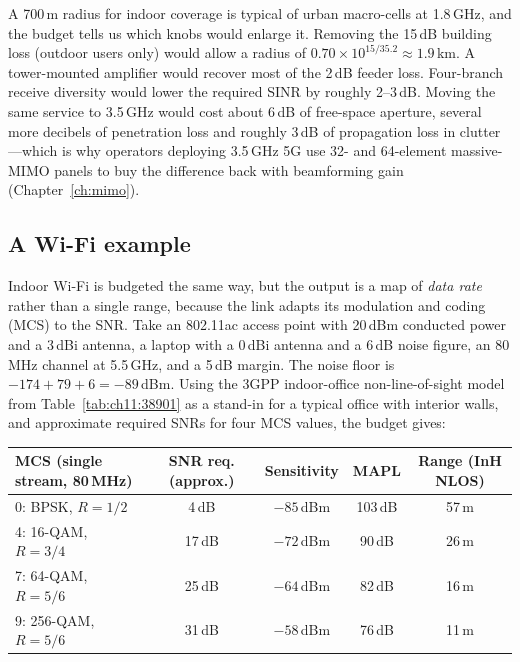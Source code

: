 
A 700\,m radius for indoor coverage is typical of urban macro-cells at 1.8\,GHz, and the budget
tells us which knobs would enlarge it. Removing the 15\,dB building loss (outdoor users only)
would allow a radius of $0.70\times10^{15/35.2}\approx1.9$\,km. A tower-mounted amplifier would
recover most of the 2\,dB feeder loss. Four-branch receive diversity would lower the required
SINR by roughly 2--3\,dB. Moving the same service to 3.5\,GHz would cost about 6\,dB of free-space
aperture, several more decibels of penetration loss and roughly 3\,dB of propagation loss in
clutter---which is why operators deploying 3.5\,GHz 5G use 32- and 64-element massive-MIMO panels
to buy the difference back with beamforming gain (Chapter~\ref{ch:mimo}).

\subsection{A Wi-Fi example}

Indoor Wi-Fi is budgeted the same way, but the output is a map of \emph{data rate} rather than
a single range, because the link adapts its modulation and coding (MCS) to the SNR. Take an
802.11ac access point with 20\,dBm conducted power and a 3\,dBi antenna, a laptop with a 0\,dBi
antenna and a 6\,dB noise figure, an 80\,MHz channel at 5.5\,GHz, and a 5\,dB margin. The noise floor
is $-174+79+6=-89$\,dBm. Using the 3GPP indoor-office non-line-of-sight model from
Table~\ref{tab:ch11:38901} as a stand-in for a typical office with interior walls, and approximate
required SNRs for four MCS values, the budget gives:

\begin{center}\small
\begin{tabular}{@{}lcccc@{}}
\toprule
MCS (single stream, 80\,MHz) & SNR req. (approx.) & Sensitivity & MAPL & Range (InH NLOS)\\
\midrule
0: BPSK, $R=1/2$ & 4\,dB & $-85$\,dBm & 103\,dB & 57\,m \\
4: 16-QAM, $R=3/4$ & 17\,dB & $-72$\,dBm & 90\,dB & 26\,m \\
7: 64-QAM, $R=5/6$ & 25\,dB & $-64$\,dBm & 82\,dB & 16\,m \\
9: 256-QAM, $R=5/6$ & 31\,dB & $-58$\,dBm & 76\,dB & 11\,m \\
\bottomrule
\end{tabular}
\end{center}

